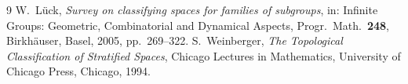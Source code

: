 \documentclass[12pt]{article}
\theoremstyle{definition}
\begin{document}
\begin{thebibliography}{9}
W.~L\"uck, \emph{Survey on classifying spaces for families of subgroups}, in:
Infinite Groups: Geometric, Combinatorial and Dynamical Aspects, Progr.\ Math.\
\textbf{248}, Birkh\"auser, Basel, 2005, pp.\ 269--322.
S.~Weinberger, \emph{The Topological Classification of Stratified Spaces}, Chicago
Lectures in Mathematics, University of Chicago Press, Chicago, 1994.
\end{thebibliography}
\end{document}
